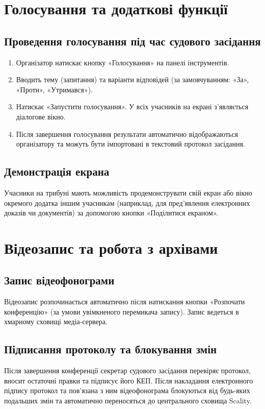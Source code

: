 \documentclass{article}
\begin{document}
\section{Голосування та додаткові функції}

\subsection{Проведення голосування під час судового засідання}
\begin{enumerate}
    \item Організатор натискає кнопку «Голосування» на панелі інструментів.
    \item Вводить тему (запитання) та варіанти відповідей (за замовчуванням: «За», «Проти», «Утримався»).
    \item Натискає «Запустити голосування». У всіх учасників на екрані з’являється діалогове вікно.
    \item Після завершення голосування результати автоматично відображаються організатору та можуть бути імпортовані в текстовий протокол засідання.
\end{enumerate}

\subsection{Демонстрація екрана}
Учасники на трибуні мають можливість продемонструвати свій екран або вікно окремого додатка іншим учасникам (наприклад, для пред'явлення електронних доказів чи документів) за допомогою кнопки «Поділитися екраном».

\newpage

\section{Відеозапис та робота з архівами}

\subsection{Запис відеофонограми}
Відеозапис розпочинається автоматично після натискання кнопки «Розпочати конференцію» (за умови увімкненого перемикача запису). Запис ведеться в хмарному сховищі медіа-сервера.

\subsection{Підписання протоколу та блокування змін}
Після завершення конференції секретар судового засідання перевіряє протокол, вносит остаточні правки та підписує його КЕП. Після накладання електронного підпису протокол та пов’язана з ним відеофонограма блокуються від будь-яких подальших змін та автоматично переносяться до центрального сховища Scality.
\end{document}
